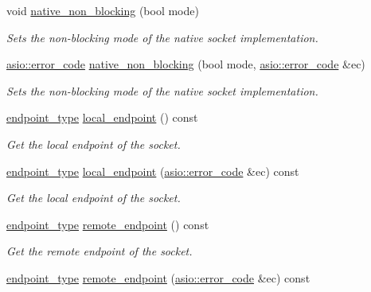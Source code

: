 \begin{DoxyCompactItemize}
void \hyperlink{classasio_1_1basic__socket_a35caacbf13740a3ced686730fc730115}{native\+\_\+non\+\_\+blocking} (bool mode)
\begin{DoxyCompactList}\small\item\em Sets the non-\/blocking mode of the native socket implementation. \end{DoxyCompactList}\item 
\hyperlink{classasio_1_1error__code}{asio\+::error\+\_\+code} \hyperlink{classasio_1_1basic__socket_ad1ff1c090ac8d393778f7486c92d07f6}{native\+\_\+non\+\_\+blocking} (bool mode, \hyperlink{classasio_1_1error__code}{asio\+::error\+\_\+code} \&ec)
\begin{DoxyCompactList}\small\item\em Sets the non-\/blocking mode of the native socket implementation. \end{DoxyCompactList}\item 
\hyperlink{classasio_1_1basic__socket_a6b2ba27d020bb24356c691f19f8d2829}{endpoint\+\_\+type} \hyperlink{classasio_1_1basic__socket_a2d02f45a3532d160579b7ad07dfdd5b9}{local\+\_\+endpoint} () const 
\begin{DoxyCompactList}\small\item\em Get the local endpoint of the socket. \end{DoxyCompactList}\item 
\hyperlink{classasio_1_1basic__socket_a6b2ba27d020bb24356c691f19f8d2829}{endpoint\+\_\+type} \hyperlink{classasio_1_1basic__socket_a2bec75bc112611561d8f13db299d72af}{local\+\_\+endpoint} (\hyperlink{classasio_1_1error__code}{asio\+::error\+\_\+code} \&ec) const 
\begin{DoxyCompactList}\small\item\em Get the local endpoint of the socket. \end{DoxyCompactList}\item 
\hyperlink{classasio_1_1basic__socket_a6b2ba27d020bb24356c691f19f8d2829}{endpoint\+\_\+type} \hyperlink{classasio_1_1basic__socket_afc253533484006305481c65c070501ad}{remote\+\_\+endpoint} () const 
\begin{DoxyCompactList}\small\item\em Get the remote endpoint of the socket. \end{DoxyCompactList}\item 
\hyperlink{classasio_1_1basic__socket_a6b2ba27d020bb24356c691f19f8d2829}{endpoint\+\_\+type} \hyperlink{classasio_1_1basic__socket_a61cc239a1078a1a62589a2abedea8b76}{remote\+\_\+endpoint} (\hyperlink{classasio_1_1error__code}{asio\+::error\+\_\+code} \&ec) const 

\end{DoxyCompactItemize}

